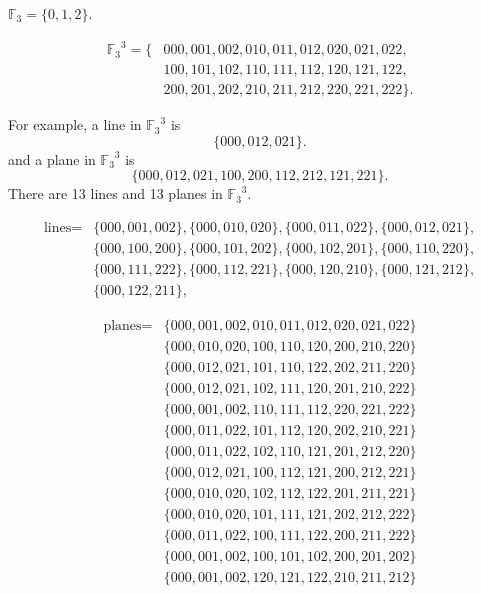 \documentclass[14pt]{chalkfjord}
\begin{document}

\begin{frame}
  $\mathbb{F}_3 = \{ 0, 1, 2 \}$.

  \vfill\pause

  \begin{align*}
  {\mathbb{F}_3}^3 = \{
  & 000, 001, 002,
  010, 011, 012,
  020, 021, 022, \\
  & 100, 101, 102,
  110, 111, 112,
  120, 121, 122, \\
  & 200, 201, 202,
  210, 211, 212,
  220, 221, 222 \}.
  \end{align*}

  \vfill\pause
  For example, a line in ${\mathbb{F}_3}^3$ is
  $$
  \{ 000, 012, 021 \}.
  $$
  and a plane in ${\mathbb{F}_3}^3$ is
  $$
  \{ 000, 012, 021, 100, 200, 112, 212, 121, 221 \}.
  $$
  \pause
  There are 13 lines and 13 planes in ${\mathbb{F}_3}^3$.

\end{frame}

\begin{frame}
\scriptsize 
  \begin{align*}
    \mbox{lines} = & \{ 000,001,002 \}, \{ 000,010,020 \}, \{ 000,011,022 \}, \{ 000,012,021 \},\\
    & \{ 000,100,200 \}, \{ 000,101,202 \}, \{ 000,102,201 \}, \{ 000,110,220 \},\\
    & \{ 000,111,222 \}, \{ 000,112,221 \}, \{ 000,120,210 \}, \{ 000,121,212 \},\\
    & \{ 000,122,211 \},
  \end{align*}

  \begin{align*}
    \mbox{planes} = & \{ 000,001,002,010,011,012,020,021,022 \}\\
    & \{ 000,010,020,100,110,120,200,210,220 \}\\
    & \{ 000,012,021,101,110,122,202,211,220 \}\\
    & \{ 000,012,021,102,111,120,201,210,222 \}\\
    & \{ 000,001,002,110,111,112,220,221,222 \}\\
    & \{ 000,011,022,101,112,120,202,210,221 \}\\
    & \{ 000,011,022,102,110,121,201,212,220 \}\\
    & \{ 000,012,021,100,112,121,200,212,221 \}\\
    & \{ 000,010,020,102,112,122,201,211,221 \}\\
    & \{ 000,010,020,101,111,121,202,212,222 \}\\
    & \{ 000,011,022,100,111,122,200,211,222 \}\\
    & \{ 000,001,002,100,101,102,200,201,202 \}\\
    & \{ 000,001,002,120,121,122,210,211,212 \}
  \end{align*}
    
\end{frame}
\end{document}
